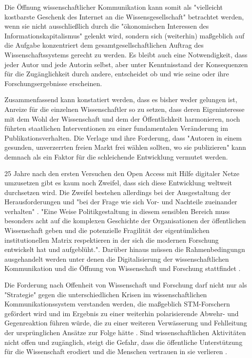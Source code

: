 Die Öffnung wissenschaftlicher Kommunikation kann somit als "vielleicht kostbarste Geschenk des Internet an die Wissensgesellschaft" betrachtet werden, wenn sie nicht ausschließlich durch die "ökonomischen Interessen des Informationskapitalismus" \cite{hagner_2015_sache_buches} gelenkt wird, sondern sich (weiterhin) maßgeblich auf die Aufgabe konzentriert dem gesamtgesellschaftlichen Auftrag des Wissenschaftssystems gerecht zu werden. Es bleibt auch eine Notwendigkeit, dass jeder Autor und jede Autorin selbst, aber unter Kenntnisstand der Konsequenzen für die Zugänglichkeit durch andere, entscheidet ob und wie seine oder ihre Forschungsergebnisse erscheinen.

Zusammenfassend kann konstatiert werden, dass es bisher weder gelungen ist, Anreize für die einzelnen Wissenschaftler so zu setzen, dass deren Eigeninteresse mit dem Wohl der Wissenschaft und dem der Öffentlichkeit harmonieren, noch führten staatlichen Interventionen zu einer fundamentalen Veränderung im Publikationsverhalten. Die Verlage und ihre Forderung, dass "Autoren in einem gesunden, unverzerrten freien Markt frei wählen sollten, wo sie publizieren" \cite{Brussels_Declaration_2007} kann demnach als ein Faktor für die schleichende Entwicklung vermutet werden.

25 Jahre nach den ersten Versuchen den Open Access mit Hilfe digitaler Netze umzusetzen gibt es kaum noch Zweifel, dass sich diese Entwicklung weltweit durchsetzen wird. Die Zweifel bestehen allerdings bei der Ausgestaltung der Herausforderungen und "bei der Frage wie sich Vor- und Nachteile zueinander verhalten" \cite{hagner_2015_sache_buches}. "Eine Weise Politikgestaltung in diesem sensiblen Bereich muss besonders acht auf die komplexen Geschichte der Organisationen der öffentlichen Wissenschaft geben und die potenzielle Fragilität der eigentümlichen institutionellen Matrix respektieren in der sich die modernen Forschung entwickelt hat und aufgeblüht."\cite{david1998_common}. Darüber hinaus müssen die Rahmenbedingungn ausgehandelt werden unter denen die Digitalisierung der wissenschaftlichen Kommunikation und die Öffnung von Wissenschaft und Forschung stattfindet \cite{mennes_2013_making_os}.

Die Forderung nach Offenheit von Wissenschaft und Forschung darf nicht nur als "Strategie" gegen die unterschiedlichen Krisen im wissenschaftlichen Kommunikationssystem verstanden werden, die maßgeblich STM-Forschern gefördert wird und im Ergebnis zu einer weiterhin polarisierende Abwehr- und Gegenreaktion führen würde, die zu einer weiteren Verwässerung und Fehlleitung der ursprünglichen Ansätze zur Folge hätte \cite{naeder_2010_open}. Sind wissenschaftlichen Aktivitäten nicht offen und zugänglich, steigt die Gefahr, dass die öffentliche Unterstützung für die Wissenschaft erodiert und die Menschen vertrauen in sie verlieren \cite{resnik_2005_ethics}.

